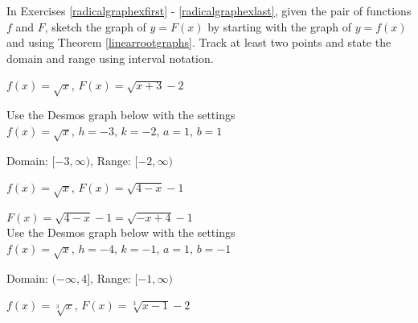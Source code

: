 \documentclass{ximera}
\begin{document}
	\author{Stitz-Zeager}


\begin{question}
In Exercises \ref{radicalgraphexfirst} - \ref{radicalgraphexlast},  given the pair of functions $f$ and $F$, sketch the graph of $y=F(x)$ by starting with the graph of $y = f(x)$ and using Theorem \ref{linearrootgraphs}.   Track at least two points and state the domain and range using interval notation.




\begin {problem} \label{radicalgraphexfirst}
$f(x) = \sqrt{x}$, $F(x) = \sqrt{x+3}-2$

\begin{solution}
Use the Desmos graph below with the settings $f(x)=\sqrt{x},\,h=-3,\,k=-2,\,a=1,\,b=1$

\begin{center} 
\end{center}

Domain:  $[-3, \infty)$, Range: $[-2, \infty)$

\end{solution} 
\end {problem}

\begin {problem}
$f(x) = \sqrt{x}$, $F(x) = \sqrt{4-x}-1$ 

\begin{solution}
$F(x) = \sqrt{4-x}-1 = \sqrt{-x+4} - 1$ \\

Use the Desmos graph below with the settings $f(x)=\sqrt{x},\,h=-4,\,k=-1,\,a=1,\,b=-1$

\begin{center} 
\end{center}

Domain:  $(-\infty, 4]$, Range: $[-1, \infty)$

\end{solution} 

\end {problem}

\begin {problem}
$f(x) = \sqrt[3]{x}$, $F(x) = \sqrt[3]{x-1}-2$


\end{problem}
\end{question}
\end{document}

